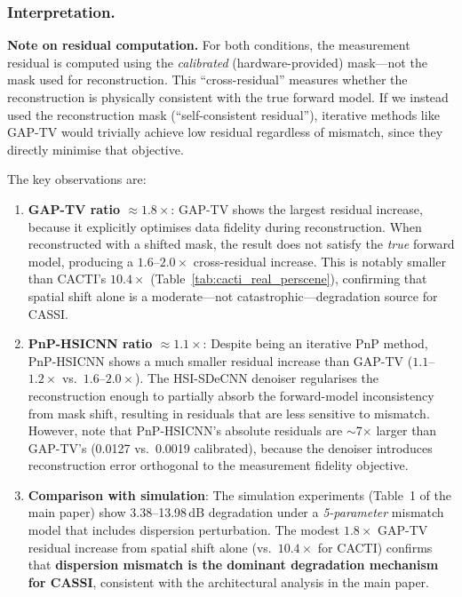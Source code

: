\documentclass[runningheads]{llncs}
\begin{document}
\subsubsection{Interpretation.}

\textbf{Note on residual computation.}
For both conditions, the measurement residual is computed using the \emph{calibrated} (hardware-provided) mask---not the mask used for reconstruction.
This ``cross-residual'' measures whether the reconstruction is physically consistent with the true forward model.
If we instead used the reconstruction mask (``self-consistent residual''), iterative methods like GAP-TV would trivially achieve low residual regardless of mismatch, since they directly minimise that objective.

The key observations are:
\begin{enumerate}
    \item \textbf{GAP-TV ratio $\approx 1.8\times$}: GAP-TV shows the largest residual increase, because it explicitly optimises data fidelity during reconstruction. When reconstructed with a shifted mask, the result does not satisfy the \emph{true} forward model, producing a $1.6$--$2.0\times$ cross-residual increase.
    This is notably smaller than CACTI's $10.4\times$ (Table~\ref{tab:cacti_real_perscene}), confirming that spatial shift alone is a moderate---not catastrophic---degradation source for CASSI.
    \item \textbf{PnP-HSICNN ratio $\approx 1.1\times$}: Despite being an iterative PnP method, PnP-HSICNN shows a much smaller residual increase than GAP-TV ($1.1$--$1.2\times$ vs.\ $1.6$--$2.0\times$). The HSI-SDeCNN denoiser regularises the reconstruction enough to partially absorb the forward-model inconsistency from mask shift, resulting in residuals that are less sensitive to mismatch. However, note that PnP-HSICNN's absolute residuals are $\sim$7$\times$ larger than GAP-TV's (0.0127 vs.\ 0.0019 calibrated), because the denoiser introduces reconstruction error orthogonal to the measurement fidelity objective.
    \item \textbf{Comparison with simulation}: The simulation experiments (Table~1 of the main paper) show 3.38--13.98\,dB degradation under a \emph{5-parameter} mismatch model that includes dispersion perturbation. The modest $1.8\times$ GAP-TV residual increase from spatial shift alone (vs.\ $10.4\times$ for CACTI) confirms that \textbf{dispersion mismatch is the dominant degradation mechanism for CASSI}, consistent with the architectural analysis in the main paper.
\end{enumerate}
\end{document}
